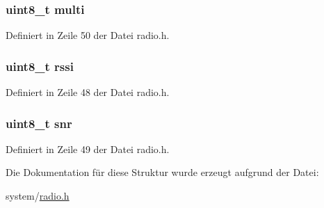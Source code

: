 \subsubsection[{multi}]{\setlength{\rightskip}{0pt plus 5cm}uint8\+\_\+t multi}\label{structradio__rsq_af829dbd700d1c5ad1abccbdb52fa7ba9}


Definiert in Zeile 50 der Datei radio.\+h.

\hypertarget{structradio__rsq_afb67d818cd76cce8057affabcb1979a6}{}
\subsubsection[{rssi}]{\setlength{\rightskip}{0pt plus 5cm}uint8\+\_\+t rssi}\label{structradio__rsq_afb67d818cd76cce8057affabcb1979a6}


Definiert in Zeile 48 der Datei radio.\+h.

\hypertarget{structradio__rsq_a11be3c6f2d5194542e5d1733cbc7ac76}{}
\subsubsection[{snr}]{\setlength{\rightskip}{0pt plus 5cm}uint8\+\_\+t snr}\label{structradio__rsq_a11be3c6f2d5194542e5d1733cbc7ac76}


Definiert in Zeile 49 der Datei radio.\+h.



Die Dokumentation für diese Struktur wurde erzeugt aufgrund der Datei\+:\begin{DoxyCompactItemize}
\item 
system/\hyperlink{radio_8h}{radio.\+h}\end{DoxyCompactItemize}
